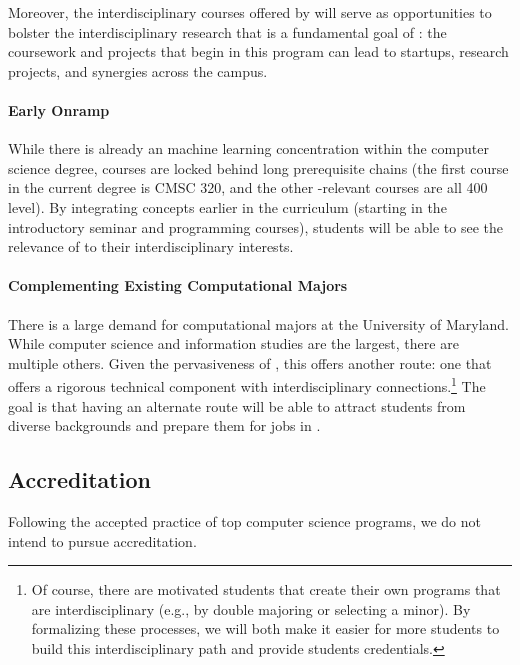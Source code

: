 Moreover, the interdisciplinary courses offered by \short{} will serve as opportunities to bolster the interdisciplinary research that is a fundamental goal of \aim{}: the coursework and projects that begin in this program can lead to startups, research projects, and synergies across the campus.

\paragraph{Early Onramp}

While there is already an machine learning  concentration within the computer science degree,  courses are locked behind long prerequisite chains (the first course in the current  degree is CMSC 320, and the other -relevant courses are all 400 level).  
%
By integrating  concepts earlier in the curriculum (starting in the introductory seminar and programming courses), students will be able to see the relevance of  to their interdisciplinary interests.

\paragraph{Complementing Existing Computational Majors}

There is a large demand for computational majors at the University of Maryland.  
%
While computer science and information studies are the largest, there are multiple others.
%
Given the pervasiveness of , this offers another route: one that offers a rigorous technical component with interdisciplinary connections.\footnote{Of course, there are motivated students that create their own programs that are interdisciplinary (e.g., by double majoring or selecting a minor).  By formalizing these processes, we will both make it easier for more students to build this interdisciplinary path and provide students credentials.}
%
The goal is that having an alternate route will be able to attract students from diverse backgrounds and prepare them for jobs in . 

\subsection{Accreditation}

Following the accepted practice of top computer science programs, we do not intend to pursue accreditation.